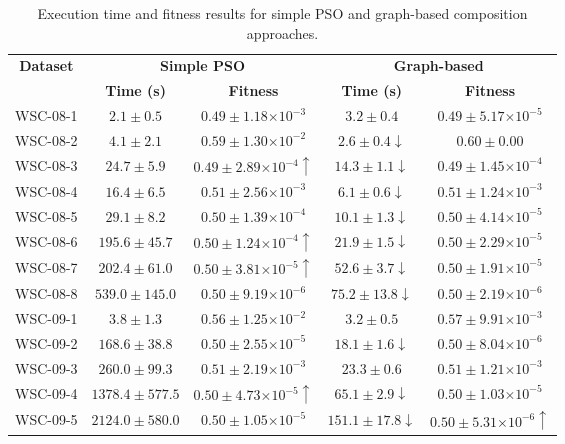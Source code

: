 \documentclass{llncs}
\providecommand{\e}[1]{\ensuremath{\times 10^{#1}}}
\begin{document}
\begin{table}[h]
\centering
\caption{Execution time and fitness results for simple PSO and graph-based composition approaches.}
\label{tab:results}
\begin{tabular}{|c|c|c|c|c|}
\hline
\multirow{2}{*}{{\bf Dataset}} & \multicolumn{2}{c|}{{\bf Simple PSO}}              & \multicolumn{2}{c|}{{\bf Graph-based}}                     \\ \cline{2-5} 
                               & {\bf Time (s)}    & {\bf Fitness}                  & {\bf Time (s)}            & {\bf Fitness}                  \\ \hline
WSC-08-1                       & $2.1 \pm 0.5$     & $0.49 \pm 1.18\e{-3}$          & $3.2 \pm 0.4$             & $0.49 \pm 5.17\e{-5}$          \\ \hline
WSC-08-2                       & $4.1 \pm 2.1$     & $0.59 \pm 1.30\e{-2}$          & $2.6 \pm 0.4 \downarrow$  & $0.60 \pm 0.00$                \\ \hline
WSC-08-3                       & $24.7 \pm 5.9$    & $0.49 \pm 2.89\e{-4} \uparrow$ & $14.3 \pm 1.1 \downarrow$ & $0.49 \pm 1.45\e{-4}$          \\ \hline
WSC-08-4                       & $16.4 \pm 6.5$    & $0.51 \pm 2.56\e{-3}$          & $6.1 \pm 0.6 \downarrow$  & $0.51 \pm 1.24\e{-3}$          \\ \hline
WSC-08-5                       & $29.1 \pm 8.2$    & $0.50 \pm 1.39\e{-4}$          & $10.1 \pm 1.3 \downarrow$ & $0.50 \pm 4.14\e{-5}$          \\ \hline
WSC-08-6                       & $195.6 \pm 45.7$  & $0.50 \pm 1.24\e{-4} \uparrow$ & $21.9 \pm 1.5 \downarrow$ & $0.50 \pm 2.29\e{-5}$          \\ \hline
WSC-08-7                       & $202.4 \pm 61.0$  & $0.50 \pm 3.81\e{-5} \uparrow$ & $52.6 \pm 3.7 \downarrow$ & $0.50 \pm 1.91\e{-5}$          \\ \hline
WSC-08-8                       & $539.0 \pm 145.0$ & $0.50 \pm 9.19\e{-6}$          & $75.2 \pm 13.8\downarrow$ & $0.50 \pm 2.19\e{-6}$          \\ \hline
WSC-09-1                       & $3.8 \pm 1.3$     & $0.56 \pm 1.25\e{-2}$          & $3.2 \pm 0.5$             & $0.57 \pm 9.91\e{-3}$          \\ \hline
WSC-09-2                       & $168.6 \pm 38.8$  & $0.50 \pm 2.55\e{-5}$          & $18.1 \pm 1.6 \downarrow$ & $0.50 \pm 8.04\e{-6}$          \\ \hline
WSC-09-3                       & $260.0 \pm 99.3$  & $0.51 \pm 2.19\e{-3}$          & $23.3 \pm 0.6$            & $0.51 \pm 1.21\e{-3}$          \\ \hline
WSC-09-4                       & $1378.4\pm 577.5$ & $0.50 \pm 4.73\e{-5} \uparrow$ & $65.1 \pm 2.9 \downarrow$ & $0.50 \pm 1.03\e{-5}$          \\ \hline
WSC-09-5                       & $2124.0\pm 580.0$ & $0.50 \pm 1.05\e{-5}$          & $151.1\pm 17.8\downarrow$ & $0.50 \pm 5.31\e{-6} \uparrow$ \\ \hline
\end{tabular}
\end{table}
\end{document}
